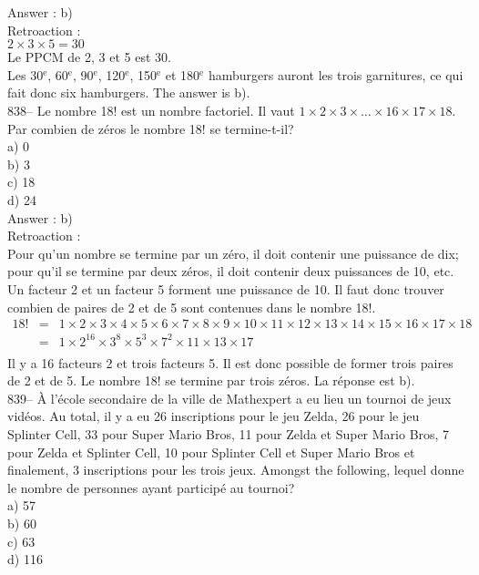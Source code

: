 ﻿\documentclass[letterpaper, 12pt]{article}
\begin{document}
Answer : b)\\

Retroaction : \\
$2\times3\times5=30$\\
Le PPCM de 2, 3 et 5 est 30.  \\
Les 30$^{\textrm{e}}$, 60$^{\textrm{e}}$, 90$^{\textrm{e}}$,
120$^{\textrm{e}}$, 150$^{\textrm{e}}$ et 180$^{\textrm{e}}$
hamburgers auront  les trois garnitures, ce qui fait donc six hamburgers.
The answer is b).\\

838-- Le nombre 18! est un nombre factoriel.  Il vaut
$1\times2\times3\times\ldots\times16\times17\times18$.  Par combien
de
z\'eros le nombre 18! se termine-t-il?\\
a) 0\\
b) 3\\
c) 18\\
d) 24\\

Answer : b)\\

Retroaction : \\
Pour qu'un nombre se termine par un z\'ero, il doit contenir une
puissance de dix; pour qu'il se termine par deux z\'eros, il doit
contenir deux puissances de 10, etc.  Un facteur 2 et un facteur 5
forment une puissance de 10.  Il faut donc trouver combien de paires
de 2 et de 5 sont contenues dans le nombre 18!.
\begin{eqnarray*}
18!
&=&1\times2\times3\times4\times5\times6\times7\times8\times9\times10\times11\times12\times13\times14\times15\times16\times17\times18\\[2mm]
&=&1\times2^{16}\times3^{8}\times5^{3}\times7^{2}\times11\times13\times17\\[2mm]
\end{eqnarray*}
Il y a 16 facteurs 2 et trois facteurs 5.  Il est donc possible de former
trois paires de 2 et de 5.  Le nombre 18! se termine par trois z\'eros.  La
r\'eponse est b).\\

839-- \`A l'\'ecole secondaire de la ville de Mathexpert a eu lieu un
tournoi de jeux vid\'eos.  Au total, il y a  eu 26 inscriptions pour le jeu
Zelda, 26 pour le jeu Splinter Cell, 33 pour Super Mario Bros, 11 pour Zelda
et Super Mario Bros, 7 pour Zelda et Splinter Cell,  10 pour Splinter Cell
et Super Mario Bros et finalement, 3 inscriptions pour les trois jeux.
Amongst the following, lequel donne le nombre de personnes ayant
particip\'e au tournoi?\\
a) 57\\
b) 60\\
c) 63\\
d) 116\\
\end{document}
